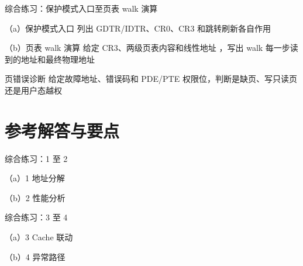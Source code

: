 \begin{chapterexercise}{综合练习：保护模式入口至页表 walk 演算}
\begin{exercisesubproblem}{（a）保护模式入口}
列出 GDTR/IDTR、CR0、CR3 和跳转刷新各自作用
\end{exercisesubproblem}
\begin{exercisesubproblem}{（b）页表 walk 演算}
给定 CR3、两级页表内容和线性地址 ，写出 walk 每一步读到的地址和最终物理地址
\end{exercisesubproblem}
\end{chapterexercise}

\begin{chapterexercise}{页错误诊断}
给定故障地址、错误码和 PDE/PTE 权限位，判断是缺页、写只读页还是用户态越权
\end{chapterexercise}

\section*{参考解答与要点}

\begin{chapteranswer}{综合练习：1 至 2}
\begin{answersubproblem}{（a）1}
地址分解
\end{answersubproblem}
\begin{answersubproblem}{（b）2}
性能分析
\end{answersubproblem}
\end{chapteranswer}

\begin{chapteranswer}{综合练习：3 至 4}
\begin{answersubproblem}{（a）3}
Cache 联动
\end{answersubproblem}
\begin{answersubproblem}{（b）4}
异常路径
\end{answersubproblem}
\end{chapteranswer}

